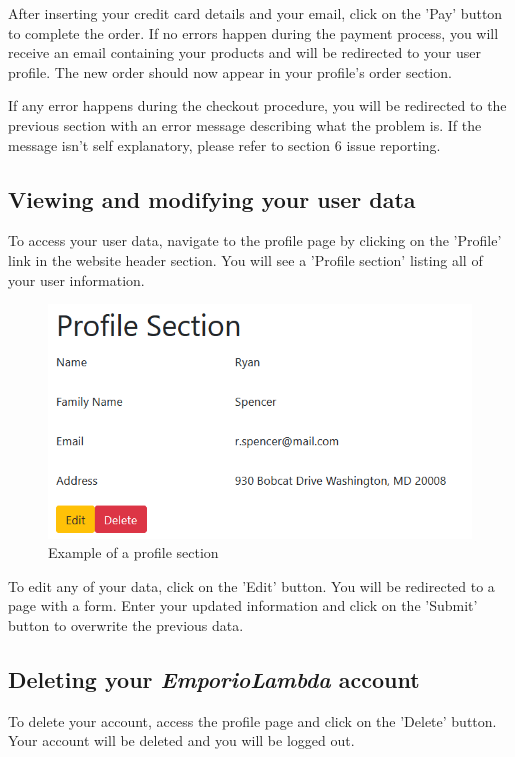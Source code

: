 After inserting your credit card details and your email, click on the 'Pay' button to complete the order. If no errors happen during the payment process, you will receive an email containing your products and will be redirected to your user profile. The new order should now appear in your profile's order section. 

If any error happens during the checkout procedure, you will be redirected to the previous section with an error message describing what the problem is. If the message isn't self explanatory, please refer to section 6 issue reporting.

\subsection{Viewing and modifying your user data}
To access your user data, navigate to the profile page by clicking on the 'Profile' link in the website header section. You will see a 'Profile section' listing all of your user information.

\begin{figure}[H]
\centering
\includegraphics[scale=0.6]{res/Immagini/ProfilePage}
\caption{Example of a profile section}
\end{figure}

To edit any of your data, click on the 'Edit' button. You will be redirected to a page with a form. Enter your updated information and click on the 'Submit' button to overwrite the previous data.

\subsection{Deleting your \textit{EmporioLambda} account}
To delete your account, access the profile page and click on the 'Delete' button. Your account will be deleted and you will be logged out.

